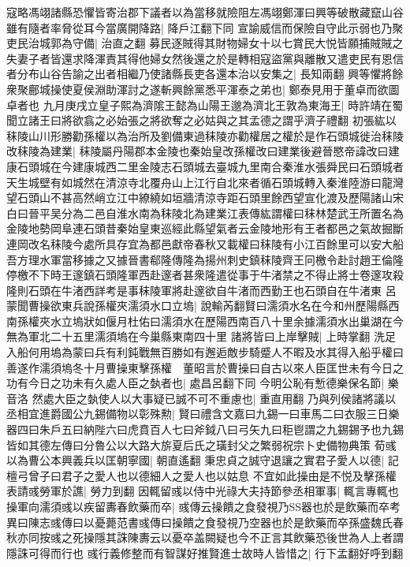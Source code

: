 寇略馮翊諸縣恐懼皆寄治郡下議者以為當移就險阻左馮翊鄭渾曰興等破散藏竄山谷雖有隨者率脅從耳今當廣開降路|{
	降戶江翻下同}
宣諭威信而保險自守此示弱也乃聚吏民治城郭為守備|{
	治直之翻}
募民逐賊得其財物婦女十以七賞民大悦皆願捕賊賊之失妻子者皆還求降渾責其得他婦女然後還之於是轉相寇盜黨與離散又遣吏民有恩信者分布山谷告諭之出者相繼乃使諸縣長吏各還本治以安集之|{
	長知兩翻}
興等懼將餘衆聚鄜城操使夏侯淵助渾討之遂斬興餘黨悉平渾泰之弟也|{
	鄭泰見用于董卓而欲圖卓者也}
九月庚戌立皇子熙為濟隂王懿為山陽王邈為濟北王敦為東海王|{
	時許靖在蜀聞立諸王曰將欲翕之必始張之將欲奪之必姑與之其孟德之謂乎濟子禮翻}
初張紘以秣陵山川形勝勸孫權以為治所及劉備東過秣陵亦勸權居之權於是作石頭城徙治秣陵改秣陵為建業|{
	秣陵屬丹陽郡本金陵也秦始皇改孫權改曰建業後避晉愍帝諱改曰建康石頭城在今建康城西二里金陵志石頭城去臺城九里南合秦淮水張舜民曰石頭城者天生城壁有如城然在清涼寺北覆舟山上江行自北來者循石頭城轉入秦淮陸游曰龍灣望石頭山不甚高然峭立江中繚繞如垣牆清涼寺距石頭里餘西望宣化渡及歷陽諸山宋白曰晉平吴分為二邑自淮水南為秣陵北為建業江表傳紘謂權曰秣林楚武王所置名為金陵地勢岡阜連石頭昔秦始皇東巡經此縣望氣者云金陵地形有王者都邑之氣故掘斷連岡改名秣陵今處所具存宜為都邑獻帝春秋又載權曰秣陵有小江百餘里可以安大船吾方理水軍當移據之又據晉書郗隆傳隆為揚州刺史鎮秣陵齊王冋檄令赴討趙王倫隆停檄不下時王邃鎮石頭隆軍西赴邃者甚衆隆遣從事于牛渚禁之不得止將士卷邃攻殺隆則石頭在牛渚西詳考是事秣陵軍將赴邃欲自牛渚而西勤王也石頭自在牛渚東}
呂蒙聞曹操欲東兵說孫權夾濡須水口立塢|{
	說輸芮翻賢曰濡須水名在今和州歷陽縣西南孫權夾水立塢狀如偃月杜佑曰濡須水在歷陽西南百八十里余據濡須水出巢湖在今無為軍北二十五里濡須塢在今巢縣東南四十里}
諸將皆曰上岸擊賊|{
	上時掌翻}
洗足入船何用塢為蒙曰兵有利鈍戰無百勝如有邂逅敵步騎蹙人不暇及水其得入船乎權曰善遂作濡須塢冬十月曹操東擊孫權　董昭言於曹操曰自古以來人臣匡世未有今日之功有今日之功未有久處人臣之埶者也|{
	處昌呂翻下同}
今明公恥有慙德樂保名節|{
	樂音洛}
然處大臣之埶使人以大事疑已誠不可不重慮也|{
	重直用翻}
乃與列侯諸將議以丞相宜進爵國公九錫備物以彰殊勲|{
	賢曰禮含文嘉曰九錫一曰車馬二曰衣服三日樂器四曰朱戶五曰納陛六曰虎賁百人七曰斧鉞八曰弓矢九曰秬鬯謂之九錫錫予也九錫皆如其德左傳曰分魯公以大路大旂夏后氏之璜封父之繁弱祝宗卜史備物典策}
荀彧以為曹公本興義兵以匡朝寧國|{
	朝直遙翻}
秉忠貞之誠守退讓之實君子愛人以德|{
	記檀弓曾子曰君子之愛人也以德細人之愛人也以姑息}
不宜如此操由是不悦及擊孫權表請彧勞軍於譙|{
	勞力到翻}
因輒留彧以侍中光祿大夫持節參丞相軍事|{
	輒言專輒也}
操軍向濡須彧以疾留夀春飲藥而卒|{
	彧傳云操饋之食發視乃器也於是飲藥而卒考異曰陳志彧傳曰以憂薨范書彧傳曰操饋之食發視乃空器也於是飲藥而卒孫盛魏氏春秋亦同按彧之死操隱其誅陳夀云以憂卒盖闕疑也今不正言其飲藥恐後世為人上者謂隱誅可得而行也}
彧行義修整而有智謀好推賢進士故時人皆惜之|{
	行下孟翻好呼到翻}


